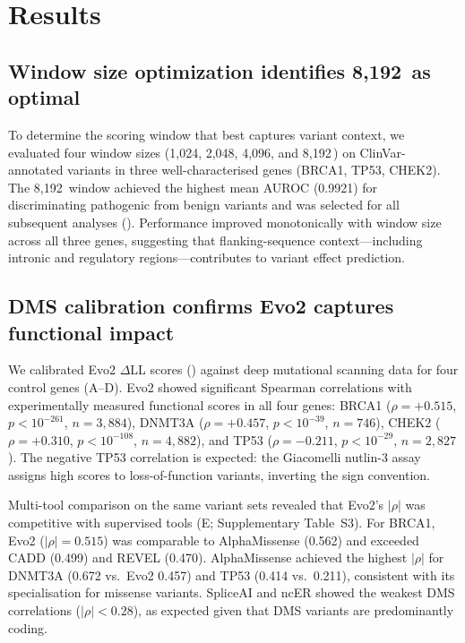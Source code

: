 \section{Results}
\label{sec:results}

\subsection{Window size optimization identifies 8,192\,\bp{} as optimal}
\label{sec:results_window}

To determine the scoring window that best captures variant context, we evaluated
four window sizes (1,024, 2,048, 4,096, and 8,192\,\bp) on ClinVar-annotated
variants in three well-characterised genes (BRCA1, TP53, CHEK2). The
8,192\,\bp{} window achieved the highest mean AUROC (0.9921) for discriminating
pathogenic from benign variants and was selected for all subsequent analyses
(). Performance improved monotonically with window size
across all three genes, suggesting that flanking-sequence context---including
intronic and regulatory regions---contributes to variant effect prediction.

\subsection{DMS calibration confirms Evo2 captures functional impact}
\label{sec:results_dms}

We calibrated Evo2 $\Delta$LL scores () against deep
mutational scanning data for four control genes (A--D). Evo2 showed significant Spearman
correlations with experimentally measured functional scores in all four genes:
BRCA1 ($\rho = +0.515$, $p < 10^{-261}$, $n = 3{,}884$),
DNMT3A ($\rho = +0.457$, $p < 10^{-39}$, $n = 746$),
CHEK2 ($\rho = +0.310$, $p < 10^{-108}$, $n = 4{,}882$),
and TP53 ($\rho = -0.211$, $p < 10^{-29}$, $n = 2{,}827$). The negative
TP53 correlation is expected: the Giacomelli nutlin-3 assay assigns high scores
to loss-of-function variants, inverting the sign convention.

Multi-tool comparison on the same variant sets revealed that Evo2's $|\rho|$
was competitive with supervised tools (E; Supplementary Table~S3).
For BRCA1, Evo2 ($|\rho| = 0.515$) was comparable to AlphaMissense (0.562) and
exceeded CADD (0.499) and REVEL (0.470). AlphaMissense achieved the highest
$|\rho|$ for DNMT3A (0.672 vs.\ Evo2 0.457) and TP53 (0.414 vs.\ 0.211),
consistent with its specialisation for missense variants. SpliceAI and ncER
showed the weakest DMS correlations ($|\rho| < 0.28$), as expected given that
DMS variants are predominantly coding.

